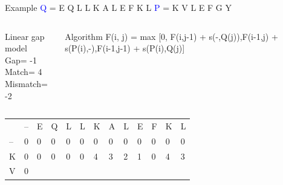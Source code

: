 \documentclass{bredelebeamer}
\begin{document}
 
 \begin{frame}{Example}
     \centering
 \textcolor{blue}{Q} = E Q L L K A L E F K L \quad \textcolor{blue}{P} = K V L E F G Y
\begin{columns}
\begin{block}{Linear gap model} \\
Gap= -1 \\
Match= 4 \\
Mismatch= -2
\end{block}
\begin{block}{Algorithm}
 F(i, j) =  max [0, F(i,j-1) + s(-,Q(j)),F(i-1,j) + s(P(i),-),F(i-1,j-1) + s(P(i),Q(j)]
\end{block}
\end{columns}
     
     \begin{table}[]
\centering
\begin{tabular}{*{13}{p{0.4cm}}}
                        & --                     & E                      & Q                      & L                      & L                      & \cellcolor[HTML]{FFFF00}K                      & A                      & L                      & E                      & F                      & \cellcolor[HTML]{FFFF00}K                      & L                      \\ \cline{2-13} 
\multicolumn{1}{l|}{--} & \multicolumn{1}{l|}{0} & \multicolumn{1}{l|}{0} & \multicolumn{1}{l|}{0} & \multicolumn{1}{l|}{0} & \multicolumn{1}{l|}{0} & \multicolumn{1}{l|}{0} & \multicolumn{1}{l|}{0} & \multicolumn{1}{l|}{0} & \multicolumn{1}{l|}{0} & \multicolumn{1}{l|}{0} & \multicolumn{1}{l|}{0} & \multicolumn{1}{l|}{0} \\ \cline{2-13} 
\multicolumn{1}{l|}{\cellcolor[HTML]{FFFF00}K}  & \multicolumn{1}{l|}{0} &      \multicolumn{1}{l|}{0}  & \multicolumn{1}{l|}{0}  & \multicolumn{1}{l|}{0}  & \multicolumn{1}{l|}{0}  & \multicolumn{1}{l|}{4}  & \multicolumn{1}{l|}{3}  & \multicolumn{1}{l|}{2}  & \multicolumn{1}{l|}{1}  & \multicolumn{1}{l|}{0}  & \multicolumn{1}{l|}{4}  & \multicolumn{1}{l|}{3}  \\ \cline{2-13} 
\multicolumn{1}{l|}{V}  & \multicolumn{1}{l|}{0} & \multicolumn{1}{l|}{}  & \multicolumn{1}{l|}{}  & \multicolumn{1}{l|}{}  & \multicolumn{1}{l|}{}  & \multicolumn{1}{l|}{}  & \multicolumn{1}{l|}{}  & \multicolumn{1}{l|}{}  & \multicolumn{1}{l|}{}  & \multicolumn{1}{l|}{}  & \multicolumn{1}{l|}{}  & \multicolumn{1}{l|}{}  \\ \cline{2-13}  %

\end{tabular}
\end{table}
\end{frame}
\end{document}
